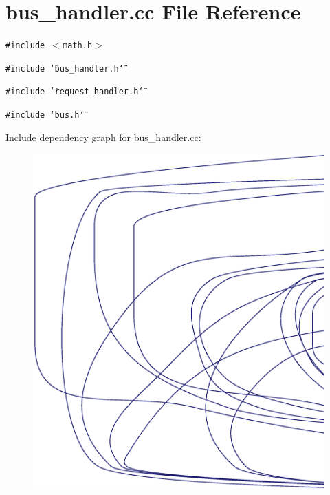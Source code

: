 \section{bus\_\-handler.cc File Reference}
\label{bus__handler_8cc}
{\tt \#include $<$math.h$>$}\par
{\tt \#include \char`\"{}bus\_\-handler.h\char`\"{}}\par
{\tt \#include \char`\"{}request\_\-handler.h\char`\"{}}\par
{\tt \#include \char`\"{}bus.h\char`\"{}}\par


Include dependency graph for bus\_\-handler.cc:\nopagebreak
\begin{figure}[H]
\begin{center}
\leavevmode
\includegraphics[width=420pt]{bus__handler_8cc__incl}
\end{center}
\end{figure}
